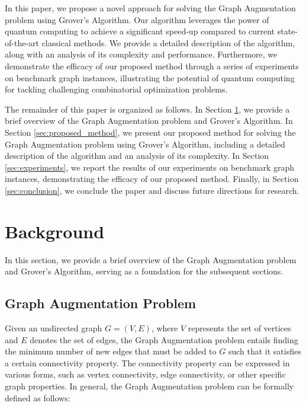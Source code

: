 In this paper, we propose a novel approach for solving the Graph Augmentation problem using Grover's Algorithm. Our algorithm leverages the power of quantum computing to achieve a significant speed-up compared to current state-of-the-art classical methods. We provide a detailed description of the algorithm, along with an analysis of its complexity and performance. Furthermore, we demonstrate the efficacy of our proposed method through a series of experiments on benchmark graph instances, illustrating the potential of quantum computing for tackling challenging combinatorial optimization problems.

The remainder of this paper is organized as follows. In Section \ref{sec:background}, we provide a brief overview of the Graph Augmentation problem and Grover's Algorithm. In Section \ref{sec:proposed_method}, we present our proposed method for solving the Graph Augmentation problem using Grover's Algorithm, including a detailed description of the algorithm and an analysis of its complexity. In Section \ref{sec:experiments}, we report the results of our experiments on benchmark graph instances, demonstrating the efficacy of our proposed method. Finally, in Section \ref{sec:conclusion}, we conclude the paper and discuss future directions for research.

\section{Background}
\label{sec:background}

In this section, we provide a brief overview of the Graph Augmentation problem and Grover's Algorithm, serving as a foundation for the subsequent sections.

\subsection{Graph Augmentation Problem}
\label{subsec:graph_augmentation_problem}

Given an undirected graph $G = (V, E)$, where $V$ represents the set of vertices and $E$ denotes the set of edges, the Graph Augmentation problem entails finding the minimum number of new edges that must be added to $G$ such that it satisfies a certain connectivity property. The connectivity property can be expressed in various forms, such as vertex connectivity, edge connectivity, or other specific graph properties. In general, the Graph Augmentation problem can be formally defined as follows:

